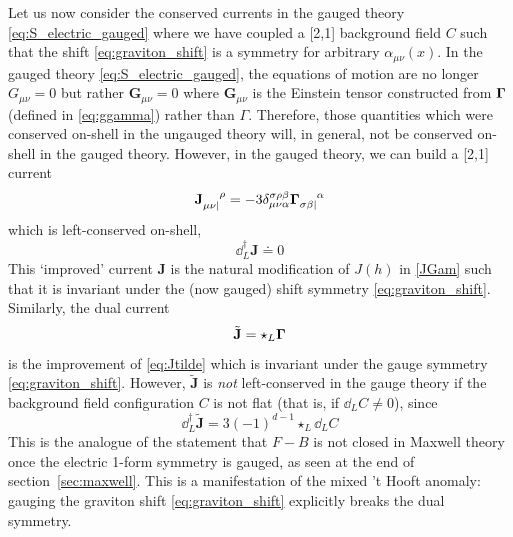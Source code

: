 Let us now consider the conserved currents in the gauged theory \eqref{eq:S_electric_gauged} where we have coupled a [2,1] background field $C$ such that the shift \eqref{eq:graviton_shift} is a symmetry for arbitrary $\alpha_{\mu\nu}(x)$.
In the gauged theory \eqref{eq:S_electric_gauged}, the equations of motion are no longer $G_{\mu\nu}=0$ but rather $\mathbf{G}_{\mu\nu}=0$ where $\mathbf{G}_{\mu\nu}$ is the Einstein tensor constructed from $\mathbf{\Gamma}$ (defined in \eqref{eq:ggamma}) rather than $\Gamma$.
Therefore, those quantities which were conserved on-shell in the ungauged theory will, in general, not be conserved on-shell in the gauged theory. However, in the gauged theory, we can build a [2,1] current
\begin{equation}
    \mathbf{J}\indices{_{\mu\nu|}^\rho} = -3 \delta_{\mu\nu\alpha}^{\sigma\rho\beta} \ggamma\indices{_{\sigma\beta|}^\alpha}
\end{equation}
which is left-conserved on-shell,
\begin{equation}\label{eq:improved_J}
    \dd_L^\dag \mathbf{J} \doteq 0
\end{equation}
This `improved' current $\mathbf{J}$ is the natural modification of $J(h)$ in \eqref{JGam} such that it is invariant under the (now gauged) shift symmetry \eqref{eq:graviton_shift}. 
Similarly, the dual current
\begin{equation}
    \tilde{\mathbf{J}} = \star_L \mathbf{\Gamma}
\end{equation}
is the improvement of \eqref{eq:Jtilde} which is invariant under the gauge symmetry \eqref{eq:graviton_shift}. 
However, $\tilde{\mathbf{J}}$ is \emph{not} left-conserved in the gauge theory if the background field configuration $C$ is not flat (that is, if $\dd_L C \neq0$), since
\begin{equation}\label{eq:improved_Jtilde}
    \dd_L^\dag \tilde{\mathbf{J}} = 3 (-1)^{d-1} \star_L \dd_L C
\end{equation}
This is the analogue of the statement that $F-B$ is not closed in Maxwell theory once the electric 1-form symmetry is gauged, as seen at the end of section~\ref{sec:maxwell}. This is a manifestation of the mixed 't Hooft anomaly: gauging the graviton shift \eqref{eq:graviton_shift} explicitly breaks the dual symmetry.

